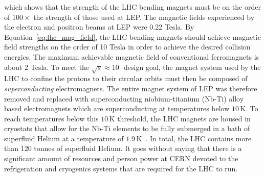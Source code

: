 which shows that the strength of the LHC bending magnets must be on the order of $100\times$
the strength of those used at LEP. The magnetic fields experienced by the electron and positron beams
at LEP were 0.22 Tesla. By Equation~\ref{eq:lhc_mag_field}, the LHC bending magnets should achieve magnetic field
strengths on the order of 10 Tesla in order to achieve the desired collision energies.
The maximum achievable magnetic field of conventional ferromagnets is about 2 Tesla.
To meet the $\sqrt{s}\approx$10\,\TeV~design goal, the magnet system used by the LHC to confine the protons to their circular orbits
must then be composed of \textit{superconducting} electromagnets. %
The entire magnet system of LEP was therefore removed and replaced with superconducting
niobium-titanium (Nb-Ti) alloy based electromagnets which are superconducting
at temperatures below $10$\,K.
To reach temperatures below this $10$\,K threshold, the LHC magnets
are housed in cryostats that allow for the Nb-Ti elements to be fully submerged in a bath
of superfluid Helium at a temperature of $1.9$\,K~\cite{Casas:1992nf}.
In total, the LHC contains more than 120 tonnes of superfluid Helium.
It goes without saying that there is a significant amount of resources and person power at CERN devoted to the refrigeration and cryogenics
systems that are required for the LHC to run.

